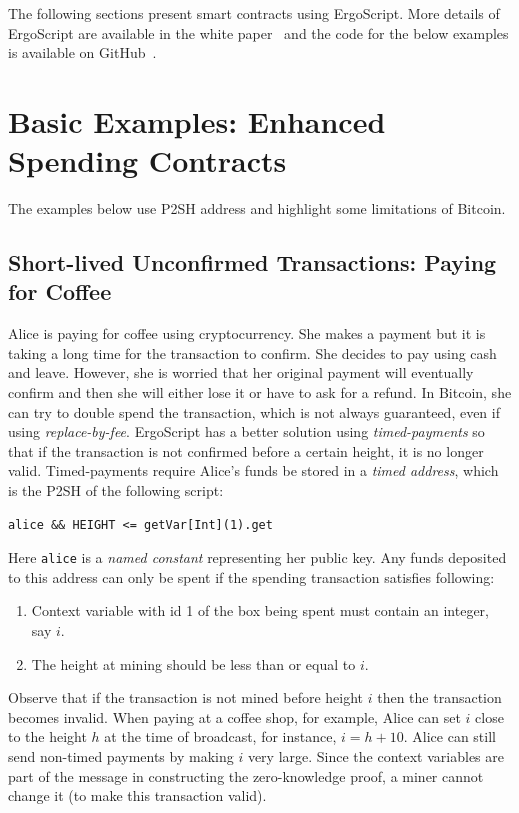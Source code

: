\documentclass[11pt]{article}
\newcommand{\langname}{ErgoScript\xspace}
\begin{document}
The following sections present smart contracts using \langname. More details of \langname are available in the white paper~\cite{whitepaper} and the code for the below examples is available on GitHub~\cite{langrepo}. 
\section{Basic Examples: Enhanced Spending Contracts}

The examples below use P2SH address and highlight some limitations of Bitcoin. 

\subsection{Short-lived Unconfirmed Transactions: Paying for Coffee}

Alice is paying for coffee using cryptocurrency. She makes a payment but it is taking a long time for the transaction to confirm. She decides to pay using cash and leave. However, she is worried that her original payment will eventually confirm and then she will either lose it or have to ask for a refund. In Bitcoin, she can try to double spend the transaction, which is not always guaranteed, even if using {\em replace-by-fee}. \langname has a better solution using {\em timed-payments} so that if the transaction is not confirmed before a certain height, it is no longer valid. Timed-payments require Alice's funds be stored in a {\em timed address}, which is the P2SH of the following script: 

\begin{verbatim}
alice && HEIGHT <= getVar[Int](1).get
\end{verbatim}

Here \texttt{alice} is a {\em named constant} representing her public key.
Any funds deposited to this address can only be spent if the spending transaction satisfies following:
\begin{enumerate}
	\item Context variable with id 1 of the box being spent must contain an integer, say $i$.
	\item The height at mining should be less than or equal to $i$. 
\end{enumerate}

Observe that if the transaction is not mined before height $i$ then the transaction becomes invalid. When paying at a coffee shop, for example, Alice can set $i$ close to the height $h$ at the time of broadcast, for instance, $i = h + 10$. 
Alice can still send non-timed payments by making $i$ very large. Since the context variables are part of the message in constructing the zero-knowledge proof, a miner cannot change it (to make this transaction valid). 
\end{document}
